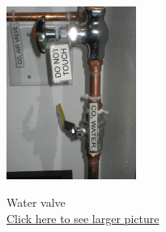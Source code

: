 \documentclass{../lab}
\begin{document}
\begin{figure}[H]
\endminipage\hfill
{}
\centering
  \href{http://experimentationlab.berkeley.edu/sites/default/files/CO-2/CO2_H2O_3529B.jpg}{\includegraphics[height=160pt,keepaspectratio]{images/CO2_H2O_3529B.jpg}}
  \caption{Water valve \\ \href{http://experimentationlab.berkeley.edu/sites/default/files/CO-2/CO2_H2O_3529B.jpg}{Click here to see larger picture}}\label{fig:WaterValve}
\endminipage
\end{figure}
\end{document}

